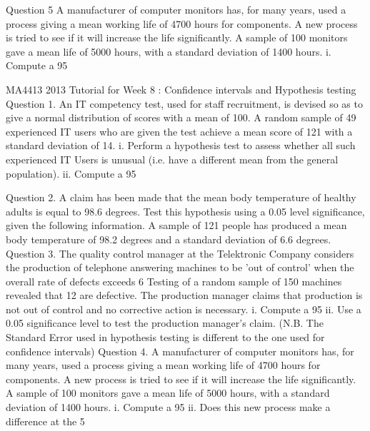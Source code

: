 \documentclass[]{report}
\begin{document}
\newpage

Question 5
A manufacturer of computer monitors  has, for many years, used a process giving a mean  working life of 4700 hours  for components.
A new process is tried to see if it will increase the life significantly. A sample of 100 monitors gave a mean life of 5000 hours, with a standard deviation of 1400 hours.
i.	Compute a 95%



\newpage

MA4413 2013 Tutorial for Week 8 : Confidence intervals and Hypothesis testing
Question 1. 
An IT competency test, used for staff recruitment, is devised so as to give a normal distribution of scores with a mean of 100. A random sample of 49 experienced IT users who are given the test achieve a mean score of 121 with a standard deviation of 14. 
i.	Perform a hypothesis test to assess whether all such experienced IT Users is unusual (i.e. have a different mean from the general population).
ii.	Compute a 95%

Question 2.
A claim has been made that the mean body temperature of healthy adults is equal to 98.6 degrees. Test this hypothesis using a 0.05 level significance, given the following information.
A sample of 121 people has produced a mean body temperature of 98.2 degrees and a standard deviation of 6.6 degrees.  
Question 3.
The quality control manager at the Telektronic Company considers the production of telephone answering machines to be ’out of control’ when the overall rate of defects exceeds 6%
Testing of a random sample of 150 machines revealed that 12 are defective. The production manager claims that production is not out of control and no corrective action is necessary.
i.	Compute a 95%
ii.	Use a 0.05 significance level to test the production manager’s claim.
(N.B. The Standard Error used in hypothesis testing is different to the one used for confidence intervals)
Question 4.
A manufacturer of computer monitors  has, for many years, used a process giving a mean  working life of 4700 hours  for components.
A new process is tried to see if it will increase the life significantly. A sample of 100 monitors gave a mean life of 5000 hours, with a standard deviation of 1400 hours.
i.	Compute a 95%
ii.	Does this new process make a difference at the 5%
\end{document}
